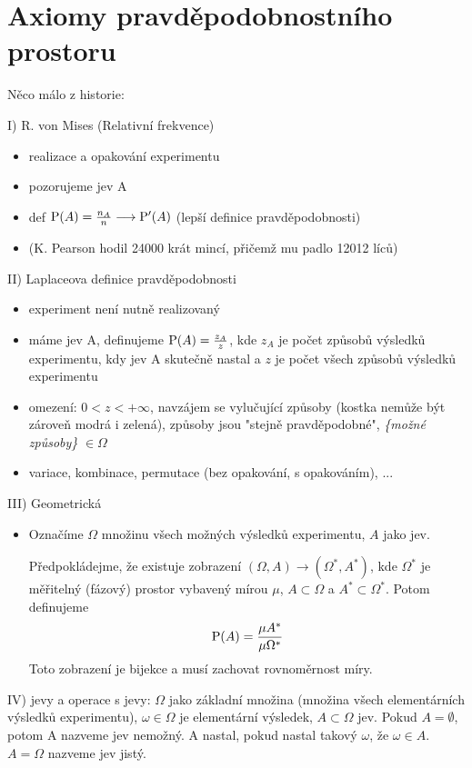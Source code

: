 \chapter{Axiomy pravděpodobnostního prostoru}
Něco málo z historie:

 I) R. von Mises (Relativní frekvence) 
 \begin{itemize}
 	
\item realizace a opakování experimentu
\item pozorujeme jev A
\item def $\mathrm{P}(A)=\frac{n_A}{n} \longrightarrow \mathrm{P}'(A)$ (lepší definice pravděpodobnosti)
\item (K. Pearson hodil 24000 krát mincí, přičemž mu padlo 12012 líců)
\end{itemize}
II) Laplaceova definice pravděpodobnosti
 \begin{itemize}
\item experiment není nutně realizovaný
\item máme jev A, definujeme $\mathrm{P}(A)=\frac{z_A}{z}$, kde $z_A$ je počet způsobů výsledků experimentu, kdy jev A skutečně nastal a $z$ je počet všech způsobů výsledků experimentu
\item omezení: $0<z<+\infty$, navzájem se vylučující způsoby (kostka nemůže být zároveň modrá i zelená), způsoby jsou "stejně pravděpodobné", \textit{\{možné způsoby\}} $\in \Omega$
\item variace, kombinace, permutace (bez opakování, s opakováním), ...
\end{itemize}
III) Geometrická
\begin{itemize}
	\item Označíme $\Omega$ množinu všech možných výsledků experimentu, $A$ jako jev. 
	
Předpokládejme, že existuje zobrazení $(\Omega,A)\longrightarrow (\Omega^*,A^*)$, kde $\Omega^*$ je měřitelný (fázový) prostor vybavený mírou $\mu$, $A\subset \Omega$ a $A^* \subset \Omega^*$. Potom definujeme 
$$ \mathrm{P}(A)=\frac{\mu A^*}{\mu \Omega^*}$$
Toto zobrazení je bijekce a musí zachovat rovnoměrnost míry.
\end{itemize}
IV) jevy a operace s jevy: $\Omega$ jako základní množina (množina všech elementárních výsledků experimentu), $\omega \in \Omega$ je elementární výsledek, $A \subset \Omega$ jev. Pokud $A=\emptyset$, potom A nazveme jev nemožný. A nastal, pokud nastal takový $\omega$, že $\omega \in A$. $A=\Omega$ nazveme jev jistý.
